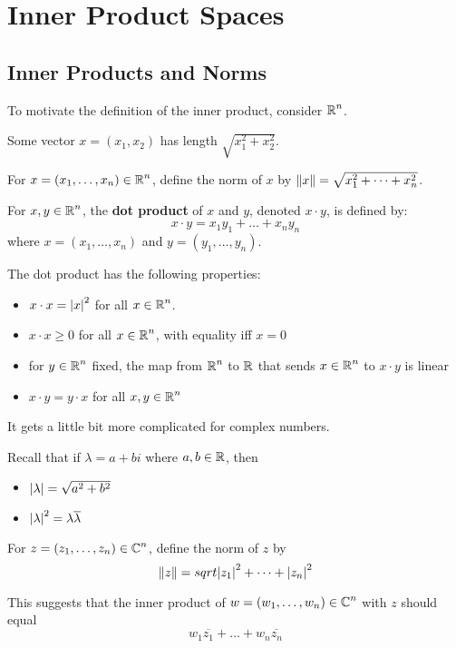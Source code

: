 
\section{Inner Product Spaces}

\subsection{Inner Products and Norms}

To motivate the definition of the inner product, consider $\operatorname{\mathbb{R}}^n$.

Some vector $x = (x_1, x_2)$ has length $\sqrt{x_1^2 + x_2^2}$.

For $x = (x_1, \dots, x_n) \in \operatorname{\mathbb{R}}^n$, define the norm of $x$ by
$\norm{x} = \sqrt{x_1^2 + \dots + x_n^2}$.

\begin{definition} 
    For $x, y \in \operatorname{\mathbb{R}}^n$, the \textbf{dot product} of $x$ and $y$,
    denoted $x \cdot y$, is defined by:
    \[ x \cdot y = x_1 y_1 + \dots + x_n y_n \]
    where $x = (x_1, \dots, x_n)$ and $y = (y_1, \dots, y_n)$.
\end{definition}

The dot product has the following properties:
\begin{itemize}
    \item $x \cdot x = \abs{x}^2$ for all $x \in \operatorname{\mathbb{R}}^n$.
    \item $x \cdot x \geq 0$ for all $x \in \operatorname{\mathbb{R}}^n$, with equality iff $x = 0$
    \item for $y \in \operatorname{\mathbb{R}}^n$ fixed, the map from $\operatorname{\mathbb{R}}^n$ to $\operatorname{\mathbb{R}}$ that sends $x \in \operatorname{\mathbb{R}}^n$ to $x \cdot y$ is linear
    \item $x \cdot y = y \cdot x$ for all $x, y \in \operatorname{\mathbb{R}}^n$
\end{itemize}

It gets a little bit more complicated for complex numbers.

Recall that if $\lambda = a + bi$ where $a, b \in \operatorname{\mathbb{R}}$, then
\begin{itemize}
    \item $\abs{\lambda} = \sqrt{a^2 + b^2}$
    \item $\abs{\lambda}^2 = \lambda \overline{\lambda}$
\end{itemize}

For $z = (z_1, \dots, z_n) \in \operatorname{\mathbb{C}}^n$, define the norm of $z$ by
\[ \norm{z} = sqrt{\abs{z_1}^2 + \dots + \abs{z_n}^2} \]

This suggests that the inner product of $w = (w_1, \dots, w_n) \in \operatorname{\mathbb{C}}^n$ with $z$
should equal
\[ w_1 \overline{z_1} + \dots + w_n \overline{z_n} \]

